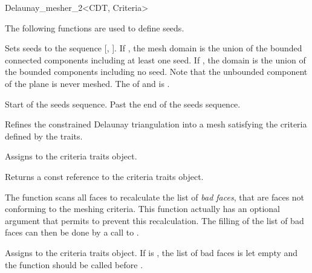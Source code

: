 \begin{ccRefClass}{Delaunay_mesher_2<CDT, Criteria>}

The following functions are used to define seeds.


                       { Sets seeds to the sequence [,
                         ]. If , the mesh domain
                         is the union of the bounded connected
                         components including at least one seed. If
                         , the domain is the union of
                         the bounded components including no seed. Note
                         that the unbounded component of the plane is
                         never meshed.
                         \ccRequire The  of
                          and  is
                         .}

{ Start of the seeds sequence. }
\ccGlue
{}
{ Past the end of the seeds sequence. }


{ Refines the constrained Delaunay triangulation into a mesh
  satisfying the criteria defined by the traits.
}

{ Assigns  to the criteria traits object. }

{ Returns a const reference to the criteria traits object. }

\begin{ccAdvanced}
  The function  scans all faces to recalculate the list of
  \emph{bad faces}, that are faces not conforming to the meshing criteria.
  This function actually has an optional argument that permits to prevent
  this recalculation. The filling of the list of bad faces can then be done
  by a call to .
  
  { Assigns  to the criteria traits object. If
     is , the list of bad faces is
    let empty and the function  should be called before
    .}


\end{ccAdvanced}
\end{ccRefClass}
